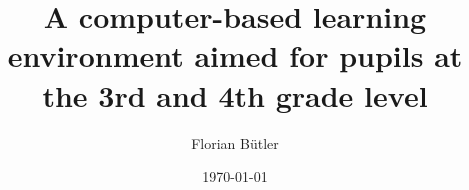 \documentclass[a4paper, oneside]{thesis}
\title{A computer-based learning environment aimed for pupils at the 3rd and 4th grade level}
\author{Florian Bütler}
\institute{Chair of Information Technology and Education \\[2pt]
ETH Zürich}
\date{\today}
\begin{document}
\frontmatter %
\maketitle

\cleardoublepage

\begin{abstract}
	
\end{abstract}

\begin{acknowledgements}
	
\end{acknowledgements}

\tableofcontents

\mainmatter %















% 
\end{document}
